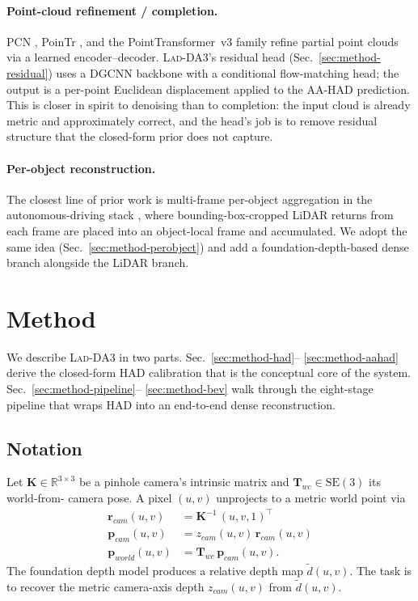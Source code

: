 \documentclass[10pt,twocolumn,letterpaper]{article}
\newcommand{\ourmethod}{\textsc{Lad-DA3}\xspace}
\begin{document}
\paragraph{Point-cloud refinement / completion.} PCN \cite{pcn},
PoinTr \cite{pointr}, and the PointTransformer~v3
\cite{pointtransformerv3} family refine partial point clouds via a
learned encoder–decoder. \ourmethod{}'s residual head
(Sec.~\ref{sec:method-residual}) uses a DGCNN backbone with a
conditional flow-matching head; the output is a per-point Euclidean
displacement applied to the AA-HAD prediction. This is closer in
spirit to denoising than to completion: the input cloud is already
metric and approximately correct, and the head's job is to remove
residual structure that the closed-form prior does not capture.

\paragraph{Per-object reconstruction.} The closest line of prior work
is multi-frame per-object aggregation in the autonomous-driving stack
\cite{multiframeperobject}, where bounding-box-cropped LiDAR returns
from each frame are placed into an object-local frame and accumulated.
We adopt the same idea (Sec.~\ref{sec:method-perobject}) and add a
foundation-depth-based dense branch alongside the LiDAR branch.


\section{Method}
\label{sec:method}

We describe \ourmethod{} in two parts. Sec.~\ref{sec:method-had}–
\ref{sec:method-aahad} derive the closed-form HAD calibration that is
the conceptual core of the system. Sec.~\ref{sec:method-pipeline}–
\ref{sec:method-bev} walk through the eight-stage pipeline that wraps
HAD into an end-to-end dense reconstruction.

\subsection{Notation}
\label{sec:method-notation}

Let $\mathbf{K}\in\mathbb{R}^{3\times 3}$ be a pinhole camera's
intrinsic matrix and $\mathbf{T}_{wc}\in\mathrm{SE}(3)$ its world-from-
camera pose. A pixel $(u,v)$ unprojects to a metric world point via
\begin{align}
\mathbf{r}_{cam}(u,v) &= \mathbf{K}^{-1}\,(u, v, 1)^\top
\label{eq:ray} \\
\mathbf{p}_{cam}(u,v) &= z_{cam}(u,v)\,\mathbf{r}_{cam}(u,v)
\label{eq:campt} \\
\mathbf{p}_{world}(u,v) &= \mathbf{T}_{wc}\,\mathbf{p}_{cam}(u,v).
\label{eq:worldpt}
\end{align}
The foundation depth model produces a relative depth map
$\tilde{d}(u,v)$. The task is to recover the metric camera-axis depth
$z_{cam}(u,v)$ from $\tilde{d}(u,v)$.
\end{document}
